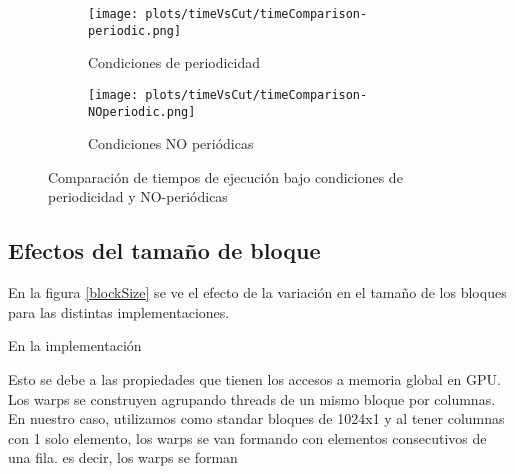 

\begin{figure}[htbp]
\centering
\begin{subfigure}[b]{\plotwidthtres}
   \texttt{[image: plots/timeVsCut/timeComparison-periodic.png]}
   \caption{Condiciones de periodicidad}
   \label{compar-1iter}
 \end{subfigure}
\begin{subfigure}[b]{\plotwidthtres}
   \texttt{[image: plots/timeVsCut/timeComparison-NOperiodic.png]}
   \caption{Condiciones NO periódicas}
   \label{compar-niter}
 \end{subfigure}
 \caption{Comparaci\'on de tiempos de ejecuci\'on bajo condiciones de periodicidad y NO-periódicas}
 \label{time-vs-cut}
\end{figure}


\subsection{Efectos del tamaño de bloque}

En la figura \ref{blockSize} se ve el efecto de la variación en el tamaño de los bloques para las distintas implementaciones.

En la implementación

Esto se debe a las propiedades que tienen los accesos a memoria global en GPU. Los warps se construyen agrupando threads de un mismo bloque por columnas. 
En nuestro caso, utilizamos como standar bloques de 1024x1 y al tener columnas con 1 solo elemento, los warps se van formando con elementos consecutivos de una fila. es decir, los warps se forman

